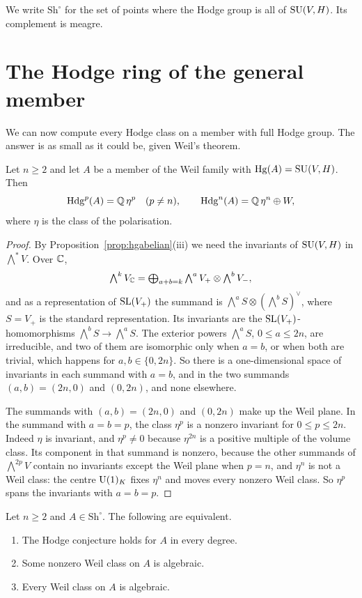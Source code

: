 We write $\mathrm{Sh}^{\circ}$ for the set of points where the Hodge group
is all of $\operatorname{SU}(V,H)$. Its complement is meagre.

\section{The Hodge ring of the general member}\label{sec:hodgering}

We can now compute every Hodge class on a member with full Hodge group.
The answer is as small as it could be, given Weil's theorem.

\begin{theorem}\label{thm:hodgering}
Let $n\ge2$ and let $A$ be a member of the Weil family with
$\operatorname{Hg}(A)=\operatorname{SU}(V,H)$. Then
\[
  \operatorname{Hdg}^{p}(A)=\mathbb{Q}\,\eta^{p}\quad(p\ne n),\qquad
  \operatorname{Hdg}^{n}(A)=\mathbb{Q}\,\eta^{n}\oplus W,
\]
where $\eta$ is the class of the polarisation.
\end{theorem}

\begin{proof}
By Proposition~\ref{prop:hgabelian}(iii) we need the invariants of
$\operatorname{SU}(V,H)$ in $\bigwedge^{*}V$. Over $\mathbb{C}$,
\[
  \textstyle\bigwedge^{k}V_{\mathbb{C}}=\bigoplus_{a+b=k}\bigwedge^{a}V_{+}\otimes
  \bigwedge^{b}V_{-},
\]
and as a representation of $\operatorname{SL}(V_{+})$ the summand is
$\bigwedge^{a}S\otimes(\bigwedge^{b}S)^{\vee}$, where $S=V_{+}$ is the
standard representation. Its invariants are the
$\operatorname{SL}(V_{+})$-homomorphisms $\bigwedge^{b}S\to\bigwedge^{a}S$. The exterior
powers $\bigwedge^{a}S$, $0\le a\le2n$, are irreducible, and two of them are
isomorphic only when $a=b$, or when both are trivial, which happens for
$a,b\in\{0,2n\}$. So there is a one-dimensional space of invariants in each
summand with $a=b$, and in the two summands $(a,b)=(2n,0)$ and $(0,2n)$,
and none elsewhere.

The summands with $(a,b)=(2n,0)$ and $(0,2n)$ make up the Weil plane. In
the summand with $a=b=p$, the class $\eta^{p}$ is a nonzero invariant for
$0\le p\le2n$. Indeed $\eta$ is invariant, and $\eta^{p}\ne0$ because
$\eta^{2n}$ is a positive multiple of the volume class. Its component in
that summand is nonzero, because the other summands of $\bigwedge^{2p}V$
contain no invariants except the Weil plane when $p=n$, and $\eta^{n}$ is
not a Weil class: the centre $\operatorname{U}(1)_{K}$ fixes $\eta^{n}$ and moves every
nonzero Weil class. So $\eta^{p}$ spans the invariants with $a=b=p$.
\end{proof}

\begin{corollary}\label{cor:oneclass}
Let $n\ge2$ and $A\in\mathrm{Sh}^{\circ}$. The following are equivalent.
\begin{enumerate}[label=(\roman*)]
\item The Hodge conjecture holds for $A$ in every degree.
\item Some nonzero Weil class on $A$ is algebraic.
\item Every Weil class on $A$ is algebraic.
\end{enumerate}
\end{corollary}

